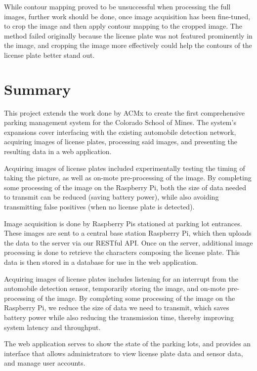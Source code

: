 \documentclass[11pt, oneside, fullpage, doublespace]{article}
\begin{document}
While contour mapping proved to be unsuccessful when processing the full images, further work should be done, once image acquisition has been fine-tuned, to crop the image and then apply contour mapping to the cropped image. The method failed originally because the license plate was not featured prominently in the image, and cropping the image more effectively could help the contours of the license plate better stand out.

\section{Summary}

This project extends the work done by ACMx to create the first comprehensive parking management system for the Colorado School of Mines. The system's expansions cover interfacing with the existing automobile detection network, acquiring images of license plates, processing said images, and presenting the resulting data in a web application.

Acquiring images of license plates included experimentally testing the timing of taking the picture, as well as on-mote pre-processing of the image. By completing some processing of the image on the Raspberry Pi, both the size of data needed to transmit can be reduced (saving battery power), while also avoiding transmitting false positives (when no license plate is detected).

Image acquisition is done by Raspberry Pis stationed at parking lot entrances. These images are sent to a central base station Raspberry Pi, which then uploads the data to the server via our RESTful API. Once on the server, additional image processing is done to retrieve the characters composing the license plate. This data is then stored in a database for use in the web application.

Acquiring images of license plates includes listening for an interrupt from the automobile detection sensor, temporarily storing the image, and on-mote pre-processing of the image. By completing some processing of the image on the Raspberry Pi, we reduce the size of data we need to transmit, which saves battery power while also reducing the transmission time, thereby improving system latency and throughput.

The web application serves to show the state of the parking lots, and provides an interface that allows administrators to view license plate data and sensor data, and manage user accounts.
\end{document}
